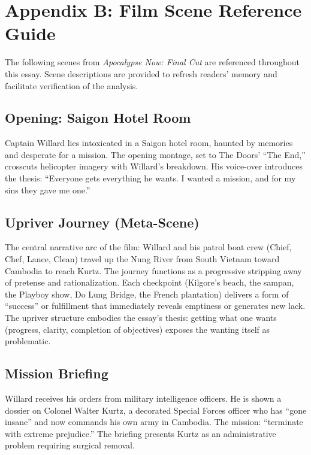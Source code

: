\section*{Appendix B: Film Scene Reference Guide}
\label{app:scene-reference}

The following scenes from \textit{Apocalypse Now: Final Cut} \parencite{CoppolaApocalypse2019}
are referenced throughout this essay. Scene descriptions are provided to refresh readers'
memory and facilitate verification of the analysis.

\subsection*{Opening: Saigon Hotel Room}
\label{scene:saigon-opening}

Captain Willard lies intoxicated in a Saigon hotel room, haunted by memories and desperate for
a mission. The opening montage, set to The Doors' ``The End,'' crosscuts helicopter imagery
with Willard's breakdown. His voice-over introduces the thesis: ``Everyone gets everything he
wants. I wanted a mission, and for my sins they gave me one.''

\subsection*{Upriver Journey (Meta-Scene)}
\label{scene:upriver-journey}

The central narrative arc of the film: Willard and his patrol boat crew (Chief, Chef, Lance,
Clean) travel up the Nung River from South Vietnam toward Cambodia to reach Kurtz. The journey
functions as a progressive stripping away of pretense and rationalization. Each checkpoint
(Kilgore's beach, the sampan, the Playboy show, Do Lung Bridge, the French plantation)
delivers a form of ``success'' or fulfillment that immediately reveals emptiness or generates
new lack. The upriver structure embodies the essay's thesis: getting what one wants (progress,
clarity, completion of objectives) exposes the wanting itself as problematic.

\subsection*{Mission Briefing}
\label{scene:briefing}

Willard receives his orders from military intelligence officers. He is shown a dossier on
Colonel Walter Kurtz, a decorated Special Forces officer who has ``gone insane'' and now
commands his own army in Cambodia. The mission: ``terminate with extreme prejudice.'' The
briefing presents Kurtz as an administrative problem requiring surgical removal.


